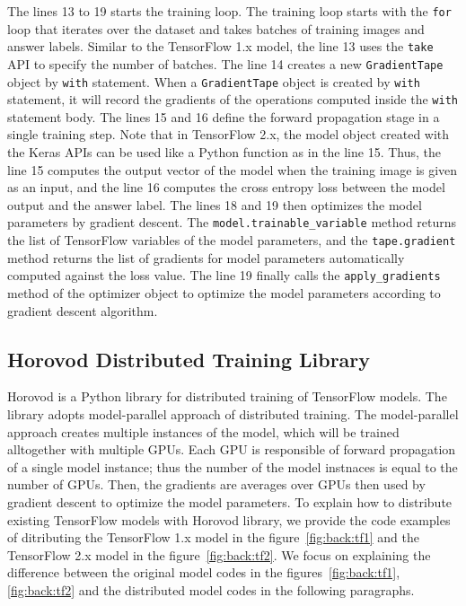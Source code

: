 The lines 13 to 19 starts the training loop.
The training loop starts with the {\tt for} loop that iterates over the dataset
and takes batches of training images and answer labels.
Similar to the TensorFlow 1.x model,
the line 13 uses the {\tt take} API to specify the number of batches.
The line 14 creates a new {\tt GradientTape} object by {\tt with} statement.
When a {\tt GradientTape} object is created by {\tt with} statement,
it will record the gradients of the operations computed inside the {\tt with}
statement body.
The lines 15 and 16 define the forward propagation stage in a single
training step.
Note that in TensorFlow 2.x, the model object created with the Keras APIs can be
used like a Python function as in the line 15.
Thus, the line 15 computes the output vector of the model when the
training image is given as an input,
and the line 16 computes the cross entropy loss between the model output and
the answer label.
The lines 18 and 19 then optimizes the model parameters by gradient descent. 
The {\tt model.trainable\_variable} method returns the list of 
TensorFlow variables of the model parameters,
and the {\tt tape.gradient} method returns the list of
gradients for model parameters automatically computed against the
loss value.
The line 19 finally calls the {\tt apply\_gradients} method of the optimizer
object to optimize the model parameters according to gradient descent algorithm.


\subsection{Horovod Distributed Training Library}

Horovod is a Python library for distributed training of TensorFlow models.
The library adopts model-parallel approach of distributed training.
The model-parallel approach creates multiple instances of the model,
which will be trained alltogether with multiple GPUs.
Each GPU is responsible of forward propagation of a single model instance;
thus the number of the model instnaces is equal to the number of GPUs.
Then, the gradients are averages over GPUs then used by gradient descent
to optimize the model parameters. 
To explain how to distribute existing TensorFlow models with Horovod library,
we provide the code examples of ditributing 
the TensorFlow 1.x model in the figure~\ref{fig:back:tf1} and the TensorFlow
2.x model in the figure~\ref{fig:back:tf2}.
We focus on explaining the difference between the original model codes in
the figures~\ref{fig:back:tf1}, \ref{fig:back:tf2} and the distributed 
model codes in the following paragraphs.

